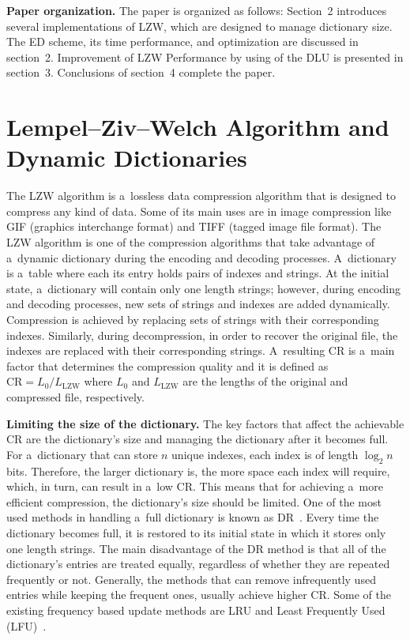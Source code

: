 \begin{multicols}{2}
 
\noindent
\textbf{Paper organization.} The paper is organized as follows: Section~2 
introduces several implementations of {LZW},  which are designed to manage 
dictionary size. The {ED} scheme, its time performance, and optimization
are discussed in section~2.
Improvement of LZW Performance by using of the DLU 
is presented in section~3.
Conclusions of section~4 complete the paper.

\vspace*{-9pt}

 
\section{Lempel--Ziv--Welch Algorithm and Dynamic Dictionaries}

\noindent
The {LZW} algorithm is a~lossless data compression algorithm that is designed 
to compress any kind of data. Some of its main uses are in image compression 
like {GIF} (graphics interchange format) and {TIFF} (tagged image file format). 
The {LZW} algorithm is one of the compression 
algorithms that take advantage of a~dynamic dictionary during the encoding and 
decoding processes. A~dictionary is a~table where each its entry holds pairs of indexes 
and strings. At the initial state, a~dictionary will contain only one length strings;
however, during encoding and decoding processes, new sets of strings and indexes 
are  added dynamically.
Compression is achieved by replacing sets of strings with their corresponding indexes. 
Similarly, during decompression, in order to recover the original file, the indexes are 
replaced with their corresponding strings. A~resulting CR is a~main 
factor that determines the compression quality and it is defined as 
$\mathrm{CR}= L_0 /L_{\mathrm{LZW}}$ where $L_0$ and $L_{\mathrm{LZW}}$ 
are the lengths of the original and 
compressed file, respectively.


\textbf{Limiting the size of the dictionary.}
The key factors that affect the achievable CR are the dictionary's 
size and managing the dictionary after it becomes full. 
For a~dictionary that can store $n$ unique indexes, each index is of 
length $\log_2 n$ bits. Therefore, the larger 
dictionary is, the more space each index will require, which, in turn, can result in 
a~low CR. This means that for achieving a~more efficient compression,
the dictionary's size should be limited. 
One of the most used methods in handling a~full dictionary is known as 
{DR}~\cite{W84}. Every time the dictionary becomes full, it is restored 
to its initial state in which it stores only one length strings. The main disadvantage 
of the {DR} method is that all of the dictionary's entries are treated equally, 
regardless of whether they are repeated frequently or not. Generally, the
methods that can 
remove infrequently used entries while keeping the frequent ones, usually achieve 
higher CR. Some of the existing frequency based update methods are 
LRU and Least Frequently Used ({LFU})~\cite{DT90}.
         

\end{multicols}
